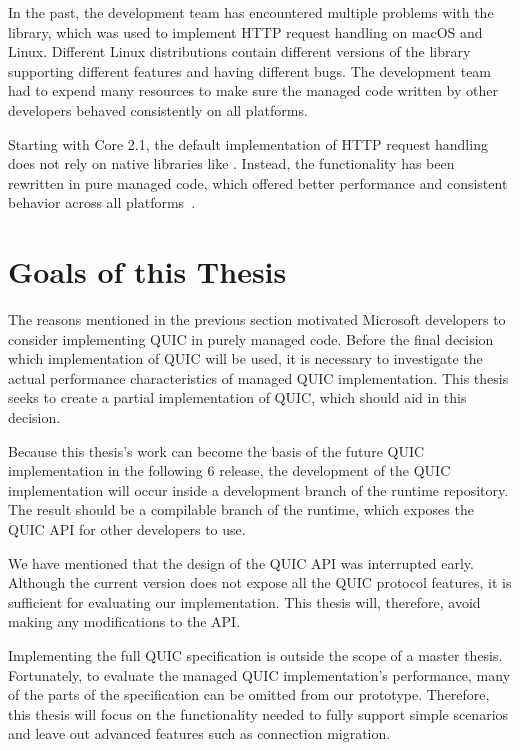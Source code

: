 In the past, the \dotnet{} development team has encountered multiple problems with the
\libcurl~\cite{curlGithub} library, which was used to implement HTTP request handling on macOS and
Linux. Different Linux distributions contain different versions of the \libcurl{} library supporting
different features and having different bugs. The \dotnet{} development team had to expend many
resources to make sure the managed code written by other \dotnet{} developers behaved consistently
on all platforms.

Starting with \dotnet{} Core 2.1, the default implementation of HTTP request handling does not rely
on native libraries like \libcurl{}. Instead, the functionality has been rewritten in pure managed
code, which offered better performance and consistent behavior across all \dotnet{}
platforms~\cite{SocketsHttpHandlerDocs}.

\section{Goals of this Thesis}

The reasons mentioned in the previous section motivated Microsoft developers to consider
implementing QUIC in purely managed \csharp{} code. Before the final decision which implementation
of QUIC will be used, it is necessary to investigate the actual performance characteristics of
managed QUIC implementation. This thesis seeks to create a partial implementation of QUIC, which
should aid in this decision.

Because this thesis's work can become the basis of the future QUIC implementation in the following
\dotnet{} 6 release, the development of the QUIC implementation will occur inside a development
branch of the \dotnet{} runtime repository. The result should be a compilable branch of the runtime,
which exposes the QUIC API for other \dotnet{} developers to use.

We have mentioned that the design of the QUIC API was interrupted early. Although the current
version does not expose all the QUIC protocol features, it is sufficient for evaluating our
implementation. This thesis will, therefore, avoid making any modifications to the API\@.

Implementing the full QUIC specification is outside the scope of a master thesis. Fortunately, to
evaluate the managed QUIC implementation's performance, many of the parts of the specification can
be omitted from our prototype. Therefore, this thesis will focus on the functionality needed to
fully support simple scenarios and leave out advanced features such as connection migration.

